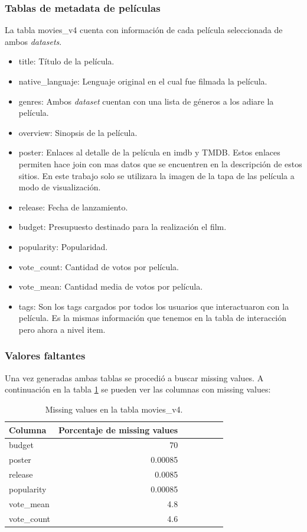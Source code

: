 \documentclass[11pt,a4paper,twoside]{thesis}
\begin{document}
\clearpage
\subsubsection*{Tablas de metadata de películas}

La tabla movies\_v4 cuenta con información de cada película seleccionada de ambos \textit{datasets}. 

\begin{itemize}
	\item title: 	Título de la película.
	\item native\_languaje: Lenguaje original en el cual fue filmada la película.
	\item genres:  	Ambos \textit{dataset} cuentan con una lista de géneros a los adiare la película.
	\item overview:	Sinopsis de la película.
	\item poster:	Enlaces al detalle de la película en imdb y TMDB. Estos enlaces
					permiten hace join con mas datos que se encuentren en la descripción de estos
			 		sitios. En este trabajo solo se utilizara la imagen de la tapa de las película
					a modo de visualización.
	\item release: 		Fecha de lanzamiento.
	\item budget: 		Presupuesto destinado para la realización el film.
	\item popularity: 	Popularidad.
	\item vote\_count: 	Cantidad de votos por película.
	\item vote\_mean: 	Cantidad media de votos por película.
	\item tags:         Son los tags cargados por todos los usuarios que interactuaron con la película. 
						Es la mismas información que tenemos en la tabla de interacción pero ahora a nivel item.
\end{itemize}

\subsubsection*{Valores faltantes}

Una vez generadas ambas tablas se procedió a buscar missing values. A continuación en la tabla \ref{table:tab} 
se pueden ver las columnas con missing values:
\begin{table}[h!]
\centering
\footnotesize
\begin{tabular}{lrrrrrr}
\hline
Columna &  Porcentaje de missing values \\
\hline
   	budget     &  70      \\
   	poster     &  0.00085 \\
   	release    &  0.0085  \\
	popularity &  0.00085 \\
	vote\_mean  &  4.8     \\
	vote\_count &  4.6     \\
\hline
\end{tabular}
\caption{Missing values en la tabla movies\_v4.}
\label{table:tab}
\end{table}
\end{document}
